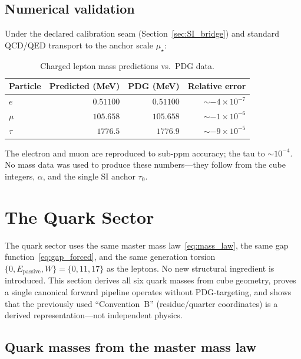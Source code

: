 \documentclass[11pt,a4paper]{article}
\theoremstyle{definition}
\theoremstyle{remark}
\newcommand{\muStar}{\mu_{\star}}
\newcommand{\Epass}{E_{\mathrm{passive}}}
\begin{document}
\subsection{Numerical validation}

Under the declared calibration seam (Section~\ref{sec:SI_bridge}) and
standard QCD/QED transport to the anchor scale $\muStar$:

\begin{table}[h]
\centering
\caption{Charged lepton mass predictions vs.\ PDG data.}
\label{tab:lepton_validation}
\begin{tabular}{lrrr}
\toprule
Particle & Predicted (MeV) & PDG (MeV) & Relative error \\
\midrule
$e$   & $0.51100$  & $0.51100$ & $\sim -4 \times 10^{-7}$ \\
$\mu$ & $105.658$  & $105.658$ & $\sim -1 \times 10^{-6}$ \\
$\tau$& $1776.5$   & $1776.9$  & $\sim -9 \times 10^{-5}$ \\
\bottomrule
\end{tabular}
\end{table}

\noindent
The electron and muon are reproduced to sub-ppm accuracy; the tau to
$\sim 10^{-4}$.  No mass data was used to produce these numbers---they
follow from the cube integers, $\alpha$, and the single SI anchor $\tau_0$.


\section{The Quark Sector}
\label{sec:quarks}

The quark sector uses the same master mass law~\eqref{eq:mass_law}, the same
gap function~\eqref{eq:gap_forced}, and the same generation torsion
$\{0, \Epass, W\} = \{0, 11, 17\}$ as the leptons.  No new structural
ingredient is introduced.  This section derives all six quark masses from
cube geometry, proves a single canonical forward pipeline operates without
PDG-targeting, and shows that the previously used ``Convention~B''
(residue/quarter coordinates) is a derived representation---not independent
physics.

\subsection{Quark masses from the master mass law}
\end{document}
